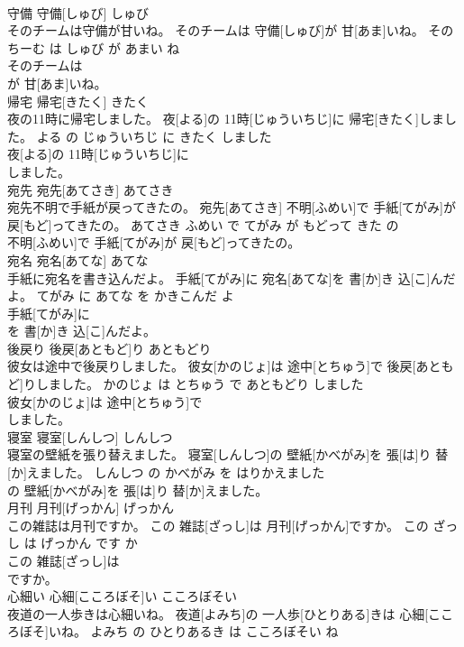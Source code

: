 \documentclass[8pt]{extreport}
\begin{document}
\begin{CJK}{UTF8}{min}
\\	守備	守備[しゅび]	しゅび	
\\	そのチームは守備が甘いね。	そのチームは 守備[しゅび]が 甘[あま]いね。	その ちーむ は しゅび が あまい ね	
\\	そのチームは
\\	が 甘[あま]いね。			
\\	帰宅	帰宅[きたく]	きたく	
\\	夜の11時に帰宅しました。	夜[よる]の 11時[じゅういちじ]に 帰宅[きたく]しました。	よる の じゅういちじ に きたく しました	
\\	夜[よる]の 11時[じゅういちじ]に
\\	しました。			
\\	宛先	宛先[あてさき]	あてさき	
\\	宛先不明で手紙が戻ってきたの。	宛先[あてさき] 不明[ふめい]で 手紙[てがみ]が 戻[もど]ってきたの。	あてさき ふめい で てがみ が もどって きた の	
\\	不明[ふめい]で 手紙[てがみ]が 戻[もど]ってきたの。			
\\	宛名	宛名[あてな]	あてな	
\\	手紙に宛名を書き込んだよ。	手紙[てがみ]に 宛名[あてな]を 書[か]き 込[こ]んだよ。	てがみ に あてな を かきこんだ よ	
\\	手紙[てがみ]に
\\	を 書[か]き 込[こ]んだよ。			
\\	後戻り	後戻[あともど]り	あともどり	
\\	彼女は途中で後戻りしました。	彼女[かのじょ]は 途中[とちゅう]で 後戻[あともど]りしました。	かのじょ は とちゅう で あともどり しました	
\\	彼女[かのじょ]は 途中[とちゅう]で
\\	しました。			
\\	寝室	寝室[しんしつ]	しんしつ	
\\	寝室の壁紙を張り替えました。	寝室[しんしつ]の 壁紙[かべがみ]を 張[は]り 替[か]えました。	しんしつ の かべがみ を はりかえました	
\\	の 壁紙[かべがみ]を 張[は]り 替[か]えました。			
\\	月刊	月刊[げっかん]	げっかん	
\\	この雑誌は月刊ですか。	この 雑誌[ざっし]は 月刊[げっかん]ですか。	この ざっし は げっかん です か	
\\	この 雑誌[ざっし]は
\\	ですか。			
\\	心細い	心細[こころぼそ]い	こころぼそい	
\\	夜道の一人歩きは心細いね。	夜道[よみち]の 一人歩[ひとりある]きは 心細[こころぼそ]いね。	よみち の ひとりあるき は こころぼそい ね	

\end{CJK}
\end{document}
